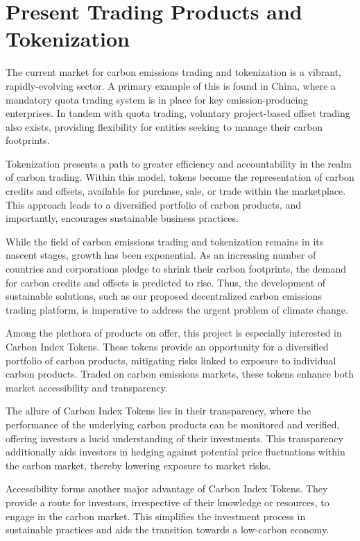 \documentclass[sigconf, authordraft]{acmart}
\begin{document}
	\section{Present Trading Products and Tokenization}


	The current market for carbon emissions trading and tokenization is a vibrant,
	rapidly-evolving sector. A primary example of this is found in China, where a
	mandatory quota trading system is in place for key emission-producing
	enterprises. In tandem with quota trading, voluntary project-based offset
	trading also exists, providing flexibility for entities seeking to manage their
	carbon footprints.

	Tokenization presents a path to greater efficiency and accountability in the realm
	of carbon trading. Within this model, tokens become the representation of carbon
	credits and offsets, available for purchase, sale, or trade within the
	marketplace. This approach leads to a diversified portfolio of carbon products,
	and importantly, encourages sustainable business practices.

	While the field of carbon emissions trading and tokenization remains in its nascent
	stages, growth has been exponential. As an increasing number of countries and corporations
	pledge to shrink their carbon footprints, the demand for carbon credits and
	offsets is predicted to rise. Thus, the development of sustainable solutions, such
	as our proposed decentralized carbon emissions trading platform, is imperative
	to address the urgent problem of climate change.

	Among the plethora of products on offer, this project is especially interested
	in Carbon Index Tokens. These tokens provide an opportunity for a diversified
	portfolio of carbon products, mitigating risks linked to exposure to individual
	carbon products. Traded on carbon emissions markets, these tokens enhance both
	market accessibility and transparency.

	The allure of Carbon Index Tokens lies in their transparency, where the
	performance of the underlying carbon products can be monitored and verified, offering
	investors a lucid understanding of their investments. This transparency
	additionally aids investors in hedging against potential price fluctuations
	within the carbon market, thereby lowering exposure to market risks.

	Accessibility forms another major advantage of Carbon Index Tokens. They
	provide a route for investors, irrespective of their knowledge or resources,
	to engage in the carbon market. This simplifies the investment process in sustainable
	practices and aids the transition towards a low-carbon economy.
\end{document}
